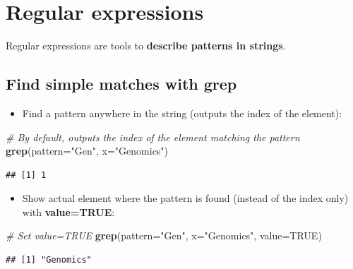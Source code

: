 \documentclass[]{book}
\newenvironment{Shaded}{\begin{snugshade}}{\end{snugshade}}
\newcommand{\CommentTok}[1]{\textcolor[rgb]{0.56,0.35,0.01}{\textit{#1}}}
\newcommand{\DataTypeTok}[1]{\textcolor[rgb]{0.13,0.29,0.53}{#1}}
\newcommand{\KeywordTok}[1]{\textcolor[rgb]{0.13,0.29,0.53}{\textbf{#1}}}
\newcommand{\NormalTok}[1]{#1}
\newcommand{\OtherTok}[1]{\textcolor[rgb]{0.56,0.35,0.01}{#1}}
\newcommand{\StringTok}[1]{\textcolor[rgb]{0.31,0.60,0.02}{#1}}
\providecommand{\tightlist}{%
  \setlength{\itemsep}{0pt}\setlength{\parskip}{0pt}}
\begin{document}
\hypertarget{regular-expressions}{%
\chapter{Regular expressions}\label{regular-expressions}}

Regular expressions are tools to \textbf{describe patterns in strings}.

\hypertarget{find-simple-matches-with-grep}{%
\section{Find simple matches with grep}\label{find-simple-matches-with-grep}}

\begin{itemize}
\tightlist
\item
  Find a pattern anywhere in the string (outputs the index of the element):
\end{itemize}

\begin{Shaded}
\begin{Highlighting}[]
\CommentTok{# By default, outputs the index of the element matching the pattern}
\KeywordTok{grep}\NormalTok{(}\DataTypeTok{pattern=}\StringTok{"Gen"}\NormalTok{, }
    \DataTypeTok{x=}\StringTok{"Genomics"}\NormalTok{)}
\end{Highlighting}
\end{Shaded}

\begin{verbatim}
## [1] 1
\end{verbatim}

\begin{itemize}
\tightlist
\item
  Show actual element where the pattern is found (instead of the index only) with \textbf{value=TRUE}:
\end{itemize}

\begin{Shaded}
\begin{Highlighting}[]
\CommentTok{# Set value=TRUE}
\KeywordTok{grep}\NormalTok{(}\DataTypeTok{pattern=}\StringTok{"Gen"}\NormalTok{,}
        \DataTypeTok{x=}\StringTok{"Genomics"}\NormalTok{,}
        \DataTypeTok{value=}\OtherTok{TRUE}\NormalTok{)}
\end{Highlighting}
\end{Shaded}

\begin{verbatim}
## [1] "Genomics"
\end{verbatim}
\end{document}
